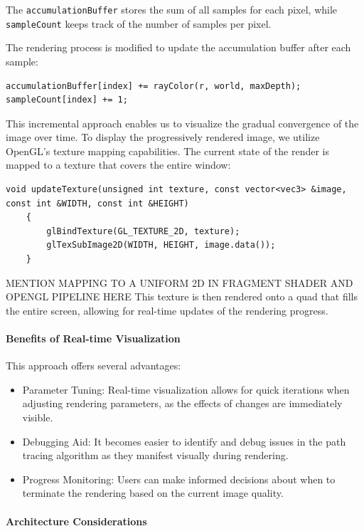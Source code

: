 \documentclass[12pt]{article}
\begin{document}
The \texttt{accumulationBuffer} stores the sum of all samples for each pixel, while \texttt{sampleCount} keeps track of the number of samples per pixel.

The rendering process is modified to update the accumulation buffer after each sample:

\begin{verbatim}
accumulationBuffer[index] += rayColor(r, world, maxDepth);
sampleCount[index] += 1;
\end{verbatim}

This incremental approach enables us to visualize the gradual convergence of the image over time.
To display the progressively rendered image, we utilize OpenGL's texture mapping capabilities. The current state of the render is mapped to a texture that covers the entire window:

\begin{verbatim}
void updateTexture(unsigned int texture, const vector<vec3> &image,
const int &WIDTH, const int &HEIGHT)
    {
        glBindTexture(GL_TEXTURE_2D, texture);
        glTexSubImage2D(WIDTH, HEIGHT, image.data());
    }
\end{verbatim}

MENTION MAPPING TO A UNIFORM 2D IN FRAGMENT SHADER AND OPENGL PIPELINE HERE
This texture is then rendered onto a quad that fills the entire screen, allowing for real-time updates of the rendering progress.

\paragraph{Benefits of Real-time Visualization}

This approach offers several advantages:

\begin{itemize}
    \item Parameter Tuning: Real-time visualization allows for quick iterations when adjusting rendering parameters, as the effects of changes are immediately visible.
    \item Debugging Aid: It becomes easier to identify and debug issues in the path tracing algorithm as they manifest visually during rendering.
    \item Progress Monitoring: Users can make informed decisions about when to terminate the rendering based on the current image quality.
\end{itemize}

\paragraph{Architecture Considerations}
\end{document}

